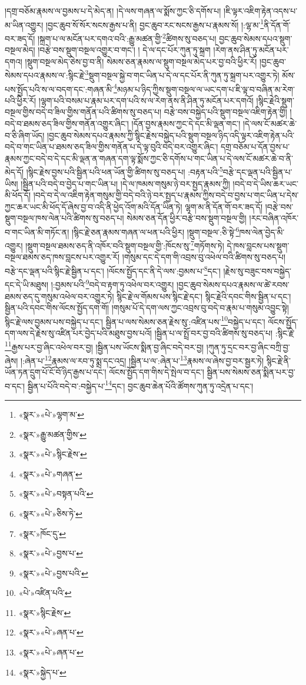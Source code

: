 །དགྲ་བཅོམ་རྣམས་ལ་བྱམས་པ་དེ་མེད་ན། །དེ་ལས་གཞན་ལ་སྨོས་ཀྱང་ཅི་དགོས་པ། །ཇི་ལྟར་འཇིག་རྟེན་འདས་པ་མ་ཡིན་འགྱུར། །བྱང་ཆུབ་སོ་སོར་སངས་རྒྱས་པ་ནི། བྱང་ཆུབ་རང་སངས་རྒྱས་པ་རྣམས་སོ། །:ལྷ་མ་\footnote{«སྣར་»«པེ་»ལྷག་མ་}ནི་དོན་གོ་བར་ཟད་དོ། །སྐྲག་པ་ལ་མངོན་པར་དགའ་བའི་:རྒྱུ་མཚན་གྱི་\footnote{«སྣར་»རྒྱུ་མཚན་གྱིས་}ཚིགས་སུ་བཅད་པ། བྱང་ཆུབ་སེམས་དཔའ་སྡུག་བསྔལ་མེད། །བརྩེ་བས་སྡུག་བསྔལ་འགྱུར་བ་གང་། །
དེ་ལ་དང་པོར་ཀུན་ཏུ་སྐྲག །རེག་ནས་ཤིན་ཏུ་མངོན་པར་དགའ། །སྡུག་བསྔལ་མེད་ཅེས་བྱ་བ་ནི། སེམས་ཅན་རྣམས་ལ་སྡུག་བསྔལ་མེད་པར་བྱ་བའི་ཕྱིར་རོ། །བྱང་ཆུབ་སེམས་དཔའ་རྣམས་ལ་:སྙིང་རྗེ་\footnote{«སྣར་»«པེ་»སྙིང་རྗེས་}སྡུག་བསྔལ་སྐྱེ་བ་གང་ཡིན་པ་དེ་ལ་དང་པོར་ནི་ཀུན་ཏུ་སྐྲག་པར་འགྱུར་ཏེ། མོས་པས་སྤྱོད་པའི་ས་ལ་བདག་དང་:གཞན་མི་\footnote{«སྣར་»«པེ་»གཞན་}མཉམ་པ་ཉིད་ཀྱིས་སྡུག་བསྔལ་ལ་ཡང་དག་པ་ཇི་ལྟ་བ་བཞིན་མ་རེག་པའི་ཕྱིར་རོ། །ལྷག་པའི་བསམ་པ་རྣམ་པར་དག་པའི་ས་ལ་རེག་ནས་ནི་ཤིན་ཏུ་མངོན་པར་དགའོ། །སྙིང་རྗེའི་སྡུག་བསྔལ་གྱིས་བདེ་བ་ཟིལ་གྱིས་གནོན་པའི་ཚིགས་སུ་བཅད་པ། བརྩེ་བས་བསྐྱེད་པའི་སྡུག་བསྔལ་འཇིག་རྟེན་གྱི། །བདེ་བ་ཐམས་ཅད་ཟིལ་གྱིས་གནོན་འགྱུར་ཞིང་། །དོན་བྱས་རྣམས་ཀྱང་དེ་དང་མི་ལྡན་གང་། །དེ་ལས་ངོ་མཚར་ཆེ་བ་ཅི་ཞིག་ཡོད། །བྱང་ཆུབ་སེམས་དཔའ་རྣམས་ཀྱི་སྙིང་རྗེས་བསྐྱེད་པའི་སྡུག་བསྔལ་ཉིད་འདི་ལྟར་འཇིག་རྟེན་པའི་བདེ་བ་གང་ཡིན་པ་ཐམས་ཅད་ཟིལ་གྱིས་གནོན་པ་དེ་ལྟ་བུའི་བདེ་བར་འགྱུར་ཞིང་། དགྲ་བཅོམ་པ་དོན་བྱས་པ་རྣམས་ཀྱང་བདེ་བ་དེ་དང་མི་ལྡན་ན་གཞན་དག་ལྟ་སྨོས་ཀྱང་ཅི་དགོས་པ་གང་ཡིན་པ་དེ་ལས་ངོ་མཚར་ཆེ་བ་ནི་མེད་དོ། །སྙིང་རྗེས་བྱས་པའི་སྦྱིན་པའི་ཕན་ཡོན་གྱི་ཚིགས་སུ་བཅད་པ། :བརྟན་པའི་\footnote{«སྣར་»«པེ་»བསྟན་པའི་}བརྩེ་དང་ལྡན་པའི་སྦྱིན་པ་ཡིས། །སྦྱིན་པའི་བདེ་བ་བྱེད་པ་གང་ཡིན་པ། །དེ་ལ་ཁམས་གསུམ་ཉེ་བར་སྤྱད་རྣམས་ཀྱི། །བདེ་བ་དེ་ཡིས་ཆར་ཡང་མི་ཕོད་དོ། །བདེ་བ་དེ་ལ་འཇིག་རྟེན་གསུམ་གྱི་བདེ་བའི་ཉེ་བར་སྤྱད་པ་རྣམས་ཀྱིས་བདེ་བ་བྱས་པ་གང་ཡིན་པ་དེས་ཀྱང་ཆར་ཡང་མི་ཕོད་དོ་ཞེས་བྱ་བ་འདི་ནི་ཕྱེད་འོག་མའི་དོན་ཡིན་ཏེ། ལྷག་མ་ནི་དོན་གོ་བར་ཟད་དོ། །བརྩེ་བས་སྡུག་བསྔལ་ཁས་ལེན་པའི་ཚིགས་སུ་བཅད་པ། སེམས་ཅན་དོན་ཕྱིར་བརྩེ་བས་སྡུག་བསྔལ་གྱི། །རང་བཞིན་འཁོར་བ་གང་ཡིན་མི་གཏོང་ན། །སྙིང་རྗེ་ཅན་རྣམས་གཞན་ལ་ཕན་པའི་ཕྱིར། །སྡུག་བསྔལ་:ཅི་སྟེ་\footnote{«སྣར་»«པེ་»ཅིས་ཏེ་}ཁས་ལེན་བྱེད་མི་འགྱུར། །སྡུག་བསྔལ་ཐམས་ཅད་ནི་འཁོར་བའི་སྡུག་བསྔལ་གྱི་:ཁོངས་སུ་\footnote{«སྣར་»ཁོང་དུ་}གཏོགས་ཏེ། དེ་ཁས་བླངས་པས་སྡུག་བསྔལ་ཐམས་ཅད་ཁས་བླངས་པར་འགྱུར་རོ། །གསུམ་དང་དེ་དག་གི་འབྲས་བུ་འཕེལ་བའི་ཚིགས་སུ་བཅད་པ། བརྩེ་དང་ལྡན་པའི་སྙིང་རྗེ་སྦྱིན་པ་དང་། །ལོངས་སྤྱོད་དང་ནི་དེ་ལས་:བྱམས་པ་\footnote{«སྣར་»«པེ་»བྱས་པ་}དང་། །རྗེས་སུ་བཟུང་བས་བསྐྱེད་དང་དེ་ཡི་མཐུས། །:བྱམས་པའི་\footnote{«སྣར་»«པེ་»བྱས་པའི་}བདེ་བ་རྟག་ཏུ་འཕེལ་བར་འགྱུར། །བྱང་ཆུབ་སེམས་དཔའ་རྣམས་ལ་ཚེ་རབས་ཐམས་ཅད་དུ་གསུམ་འཕེལ་བར་འགྱུར་ཏེ། སྙིང་རྗེ་ལ་གོམས་པས་སྙིང་རྗེ་དང་། སྙིང་རྗེའི་དབང་གིས་སྦྱིན་པ་དང་། སྦྱིན་པའི་དབང་གིས་ལོངས་སྤྱོད་དག་གོ། །གསུམ་པོ་དེ་དག་ལས་ཀྱང་འབྲས་བུ་བདེ་བ་རྣམ་པ་གསུམ་འབྱུང་སྟེ། སྙིང་རྗེ་ལས་བྱམས་པས་བསྐྱེད་པ་དང་། སྦྱིན་པ་ལས་སེམས་ཅན་རྗེས་སུ་:འཛིན་པས་\footnote{«པེ་»འཛིན་པའི་}བསྐྱེད་པ་དང་། ལོངས་སྤྱོད་དག་ལས་དེ་རྗེས་སུ་འཛིན་པར་བྱེད་པའི་མཐུས་བྱས་པའོ། །སྦྱིན་པ་ལ་སྤྲོ་བར་བྱ་བའི་ཚིགས་སུ་བཅད་པ། :སྙིང་རྗེ་\footnote{«སྣར་»སྙིང་རྗེས་}རྒྱས་པར་བྱ་ཞིང་འཕེལ་བར་བྱ། །སྦྱིན་པས་ཡོངས་སྨིན་བྱ་ཞིང་བདེ་བར་བྱ། །ཀུན་ཏུ་དྲང་བར་བྱ་ཞིང་བཀྲི་བྱ་ཞེས། །:ཞེན་པ་\footnote{«སྣར་»«པེ་»ཞན་པ་}རྣམས་ལ་རབ་ཏུ་སྨྲ་དང་འདྲ། །སྦྱིན་པ་ལ་:ཞེན་པ་\footnote{«སྣར་»«པེ་»ཞན་པ་}རྣམས་ལ་ཞེས་བྱ་བར་སྦྱར་ཏེ། སྙིང་རྗེ་ནི་ཡོན་ཏན་དྲུག་པོ་ངོ་བོ་ཉིད་རྒྱས་པ་དང་། ལོངས་སྤྱོད་དག་གིས་དེ་སྤེལ་བ་དང་། སྦྱིན་པས་སེམས་ཅན་སྨིན་པར་བྱ་བ་དང་། སྦྱིན་པ་པོའི་བདེ་བ་:བསྐྱེད་པ་\footnote{«སྣར་»སྐྱེད་པ་}དང་། བྱང་ཆུབ་ཆེན་པོའི་ཚོགས་ཀུན་ཏུ་འདྲེན་པ་དང་། 